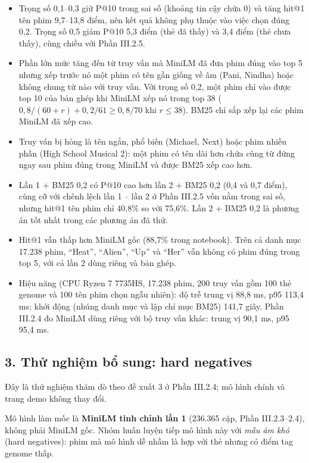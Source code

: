 \documentclass[12pt,a4paper]{article}
\providecommand{\tightlist}{\setlength{\itemsep}{0pt}\setlength{\parskip}{0pt}}
\let\oldsubsection\subsection
\renewcommand{\subsection}{\Needspace{12\baselineskip}\oldsubsection}
\begin{document}
\begin{itemize}
\tightlist
\item Trọng số 0,1--0,3 giữ P@10 trong sai số (khoảng tin cậy chứa 0) và tăng hit@1 tên phim 9,7--13,8 điểm, nên kết quả không phụ thuộc vào việc chọn đúng 0,2. Trọng số 0,5 giảm P@10 5,3 điểm (thẻ đã thấy) và 3,4 điểm (thẻ chưa thấy), cùng chiều với Phần III.2.5.
\item Phần lớn mức tăng đến từ truy vấn mà MiniLM đã đưa phim đúng vào top 5 nhưng xếp trước nó một phim có tên gần giống về âm (Pani, Nindha) hoặc không chung từ nào với truy vấn. Với trọng số 0,2, một phim chỉ vào được top 10 của bản ghép khi MiniLM xếp nó trong top 38 ($0{,}8/(60+r) + 0{,}2/61 \geq 0{,}8/70$ khi $r \leq 38$). BM25 chỉ sắp xếp lại các phim MiniLM đã xếp cao.
\item Truy vấn bị hỏng là tên ngắn, phổ biến (Michael, Next) hoặc phim nhiều phần (High School Musical 2): một phim có tên dài hơn chứa cùng từ đứng ngay sau phim đúng trong MiniLM và được BM25 xếp cao hơn.
\item Lần 1 + BM25 0,2 có P@10 cao hơn lần 2 + BM25 0,2 (0,4 và 0,7 điểm), cùng cỡ với chênh lệch lần 1 -- lần 2 ở Phần III.2.5 vốn nằm trong sai số, nhưng hit@1 tên phim chỉ 40,8\% so với 75,6\%. Lần 2 + BM25 0,2 là phương án tốt nhất trong các phương án đã thử.
\item Hit@1 vẫn thấp hơn MiniLM gốc (88,7\% trong notebook). Trên cả danh mục 17.238 phim, ``Heat'', ``Alien'', ``Up'' và ``Her'' vẫn không có phim đúng trong top 5, với cả lần 2 dùng riêng và bản ghép.
\item Hiệu năng (CPU Ryzen 7 7735HS, 17.238 phim, 200 truy vấn gồm 100 thẻ genome và 100 tên phim chọn ngẫu nhiên): độ trễ trung vị 88,8 ms, p95 113,4 ms; khởi động (nhúng danh mục và lập chỉ mục BM25) 141,7 giây. Phần III.2.4 đo MiniLM dùng riêng với bộ truy vấn khác: trung vị 90,1 ms, p95 95,4 ms.
\end{itemize}

\subsection{3. Thử nghiệm bổ sung: hard negatives}

Đây là thử nghiệm thăm dò theo đề xuất 3 ở Phần III.2.4; mô hình chính và trang demo không thay đổi.

Mô hình làm mốc là \textbf{MiniLM tinh chỉnh lần 1} (236.365 cặp, Phần III.2.3--2.4), không phải MiniLM gốc. Nhóm huấn luyện tiếp mô hình này với \textit{mẫu âm khó} (hard negatives): phim mà mô hình dễ nhầm là hợp với thẻ nhưng có điểm tag genome thấp.
\end{document}
